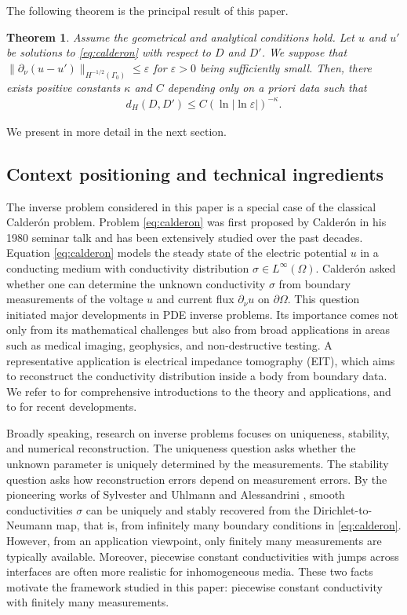 ﻿\documentclass[11pt,reqno,oneside]{amsart}
\newtheorem{theorem}{Theorem}[section]
\theoremstyle{definition}
\theoremstyle{remark}
\newcommand{\e}{\varepsilon}
\newcommand{\p}{\partial}
\renewcommand{\O}{\Omega}
\begin{document}
 The following theorem is the principal result of this paper.
 \begin{theorem}\label{th:main}
    Assume the geometrical and analytical conditions  hold. Let $u$ and $u'$ be solutions to \eqref{eq:calderon} with respect to $D$ and $D'$. We suppose that $\|\p_\nu(u-u')\|_{H^{-1/2}(\Gamma_0)}\leq \e$ for $\e>0$ being sufficiently small. Then, there exists positive constants $\kappa$ and $C$ depending only on {\it a priori} data such that
    \begin{align}\label{eq:stable}
        d_H(D,D')\leq C \left(\ln|\ln \e|\right)^{-\kappa}.
    \end{align}
 \end{theorem}
 We present  in more detail in the next section.

 \medskip

\subsection{Context positioning and technical ingredients}
The inverse problem considered in this paper is a special case of the classical Calder\'on problem. Problem \eqref{eq:calderon} was first proposed by Calder\'on in his 1980 seminar talk \cite{Calderon1980} and has been extensively studied over the past decades. Equation \eqref{eq:calderon} models the steady state of the electric potential $u$ in a conducting medium with conductivity distribution $\sigma\in L^\infty(\O)$. Calder\'on asked whether one can determine the unknown conductivity $\sigma$ from boundary measurements of the voltage $u$ and current flux $\p_\nu u$ on $\p\O$. This question initiated major developments in PDE inverse problems. Its importance comes not only from its mathematical challenges but also from broad applications in areas such as medical imaging, geophysics, and non-destructive testing. A representative application is electrical impedance tomography (EIT), which aims to reconstruct the conductivity distribution inside a body from boundary data. We refer to \cite{Ammari2008,Uhlmann2009} for comprehensive introductions to the theory and applications, and to \cite{Martins2019,Leitzke2020,Mansouri2021} for recent developments.

Broadly speaking, research on inverse problems focuses on uniqueness, stability, and numerical reconstruction. The uniqueness question asks whether the unknown parameter is uniquely determined by the measurements. The stability question asks how reconstruction errors depend on measurement errors. By the pioneering works of Sylvester and Uhlmann \cite{Sylvester1987} and Alessandrini \cite{Alessandrini1988}, smooth conductivities $\sigma$ can be uniquely and stably recovered from the Dirichlet-to-Neumann map, that is, from infinitely many boundary conditions in \eqref{eq:calderon}. However, from an application viewpoint, only finitely many measurements are typically available. Moreover, piecewise constant conductivities with jumps across interfaces are often more realistic for inhomogeneous media. These two facts motivate the framework studied in this paper: piecewise constant conductivity with finitely many measurements.
\end{document}
